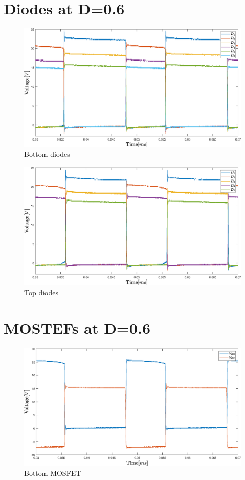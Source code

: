 \section{Diodes at D=0.6}
\begin{figure}[H]
	\centering
	\includegraphics[width=\textwidth]{figures/06Testing/botdio60per.eps}
	\caption{Bottom diodes}
\end{figure}
\begin{figure}[H]
	\centering
	\includegraphics[width=\textwidth]{figures/06Testing/topdio60per.eps}
	\caption{Top diodes}
\end{figure}

\section{MOSTEFs at D=0.6}
\begin{figure}[H]
	\centering
	\includegraphics[width=\textwidth]{figures/06Testing/botswi60per.eps}
	\caption{Bottom MOSFET}
\end{figure}

